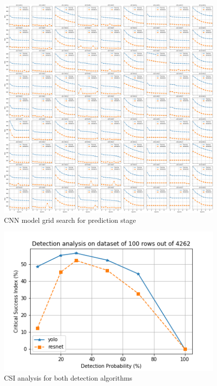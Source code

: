\begin{figure}
\centering
\includegraphics[width=1.0\linewidth]{images/grid-MSE-epochs-10.png}
\caption{CNN model grid search for prediction stage}
\label{fig:gridSearchCNN10epoch}
\end{figure} 


\begin{figure}
\centering
\includegraphics[width=0.8\linewidth]{images/detector_100-rows_CSI-analysis.png}
\caption{CSI analysis for both detection algorithms}
\label{fig:100rowCSI}
\end{figure} 

